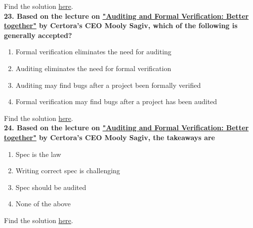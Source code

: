 Find the solution \hyperref[sec:raceXcertora_q22]{here}.\\

\textbf{23. Based on the lecture on \href{https://www.youtube.com/watch?v=VGSsPIsbb6U}{"Auditing and Formal Verification: Better together"} by Certora's CEO Mooly Sagiv, which of the following is generally accepted?}

\begin{enumerate}[label=\Alph*.]
    \item Formal verification eliminates the need for auditing
    \item Auditing eliminates the need for formal verification
    \item Auditing may find bugs after a project been formally verified
    \item Formal verification may find bugs after a project has been audited
\end{enumerate}

Find the solution \hyperref[sec:raceXcertora_q23]{here}.\\

\textbf{24. Based on the lecture on \href{https://www.youtube.com/watch?v=VGSsPIsbb6U}{"Auditing and Formal Verification: Better together"} by Certora's CEO Mooly Sagiv, the takeaways are}

\begin{enumerate}[label=\Alph*.]
    \item Spec is the law
    \item Writing correct spec is challenging
    \item Spec should be audited
    \item None of the above
\end{enumerate}

Find the solution \hyperref[sec:raceXcertora_q24]{here}.\\